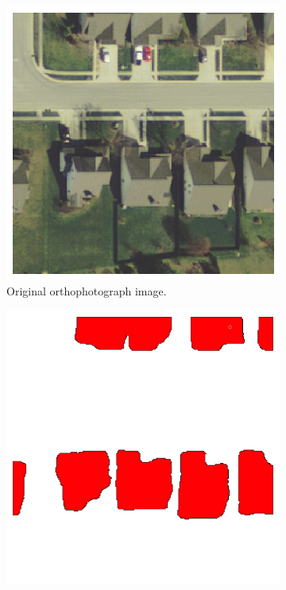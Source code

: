 \documentclass[acmtog, authorversion]{acmart}
\begin{document}
\begin{figure}
  \begin{subfigure}[h]{0.24\textwidth}
    \includegraphics[width=\textwidth]{Images/0005_0028.png}
    \caption{Original orthophotograph image.}
    \label{fig:1}
  \end{subfigure}
  \begin{subfigure}[h]{0.24\textwidth}
    \includegraphics[width=\textwidth]{Images/0005_0028_original.png}

\end{subfigure}
\end{figure}
\end{document}
